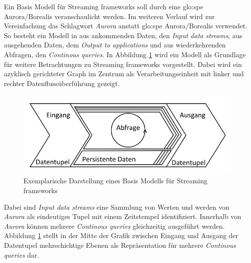 
Ein Basis Modell für Streaming frameworks soll durch eine \gls{glo:spe} Aurora/Borealis  veranschaulicht werden. Im weiteren Verlauf wird zur Vereinfachung das Schlagwort \textit{Aurora} anstatt \gls{glo:spe} Aurora/Borealis verwendet. So besteht ein Modell in  aus ankommenden Daten, den \textit{Input data streams}, aus ausgehenden Daten, dem \textit{Output to applications} und aus wiederkehrenden Abfragen, den \textit{Continous queries}. In Abbildung \ref{fig:basismodell} wird ein Modell als Grundlage für weitere Betrachtungen zu Streaming frameworks vorgestellt. Dabei wird ein azyklisch gerichteter Graph im Zentrum als Verarbeitungseinheit mit linker und rechter Datenflussüberführung gezeigt.

\begin{figure}[htb!]
\centering
\includegraphics[width=1.0\textwidth]{bilder/StreamingFrameworkBasisModell.png}
\caption{Exemplarische Darstellung eines Basis Modells für Streaming frameworks
\label{fig:basismodell}}
\end{figure}

Dabei sind \textit{Input data streams} eine Sammlung von Werten und werden von \textit{Aurora} als eindeutiges Tupel mit einem Zeitstempel identifiziert. Innerhalb von \textit{Aurora} können mehrere \textit{Continous queries} gleichzeitig ausgeführt werden. Abbildung \ref{fig:basismodell} stellt in der Mitte der Grafik zwischen Eingang und Ausgang der Datentupel mehrschichtige Ebenen als Repräsentation für mehrere \textit{Continous queries} dar.

